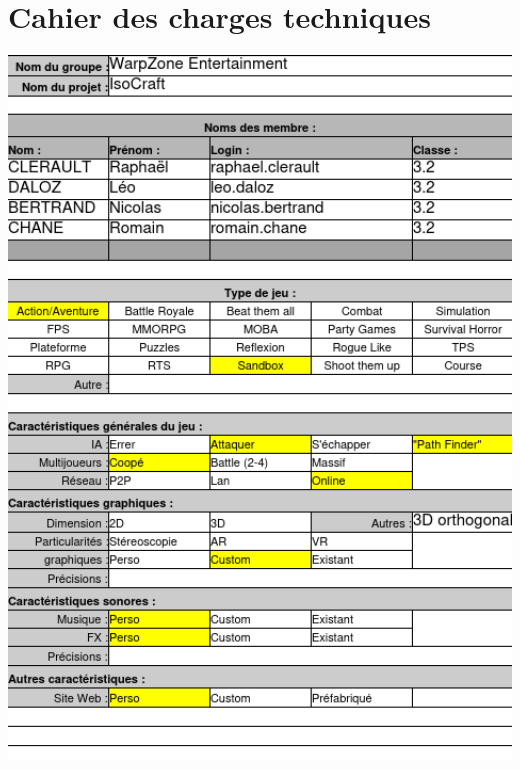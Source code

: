 \newpage\chapter{Cahier des charges techniques}\label{chapter:cdct}
\begin{center}
\includegraphics[width=1\textwidth]{figuras/Cahier-des-charges-technique1.png}

\newpage


\end{center}
